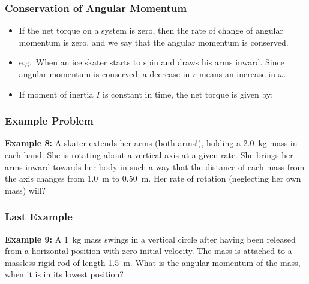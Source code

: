 \documentclass[12pt,compress,aspectratio=169]{beamer}
\newcommand{\mb}[1]{\ensuremath\mathbf{#1}}
\begin{document}
\begin{frame}
  \frametitle{Conservation of Angular Momentum}

  \vspace{-0.35in}{\Large
    \begin{displaymath}
      \bm{\tau}=\mb{r}\times\mb{F}=\mb{r}\times\frac{d\mb{p}}{dt}
      =\frac{d(\mb{r}\times\mb{p})}{dt}\;\;\longrightarrow\;\;
      \boxed{\bm{\tau} =\frac{d\mb{L}}{dt}}
    \end{displaymath}
  }
  \begin{itemize}
  \item If the net torque on a system is zero, then the rate of change
    of angular momentum is zero, and we say that the angular momentum is
    conserved. 
  \item e.g.\ When an ice skater starts to spin and draws his arms inward.
    Since angular momentum is conserved, a decrease in $r$ means an
    increase in $\omega$.
  \item If moment of inertia $I$ is constant in time, the net torque is given
    by:

  \end{itemize}
\end{frame}


\begin{frame}
  \frametitle{Example Problem}
  \textbf{Example 8:} A skater extends her arms (both arms!), holding a
  \SI{2.0}{\kg} mass in each hand. She is rotating about a vertical axis at a
  given rate. She brings her arms inward towards her body in such a way that
  the distance of each mass from the axis changes from \SI{1.0}{\metre} to
  \SI{0.50}{\metre}. Her rate of rotation (neglecting her own mass) will?
\end{frame}


\begin{frame}
  \frametitle{Last Example}
  \textbf{Example 9:} A \SI{1}{\kg} mass swings in a vertical circle after
  having been released from a horizontal position with zero initial velocity.
  The mass is attached to a massless rigid rod of length \SI{1.5}{\metre}. What
  is the angular momentum of the mass, when it is in its lowest position?
\end{frame}
\end{document}
